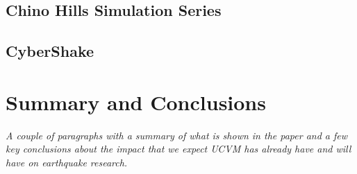 \subsection{Chino Hills Simulation Series}

\subsection{CyberShake}

\section{Summary and Conclusions}
\label{sec:conclusions}

\textit{
\color{blue}
A couple of paragraphs with a summary of what is shown in the paper and a few key conclusions about the impact that we expect UCVM has already have and will have on earthquake research.
}

